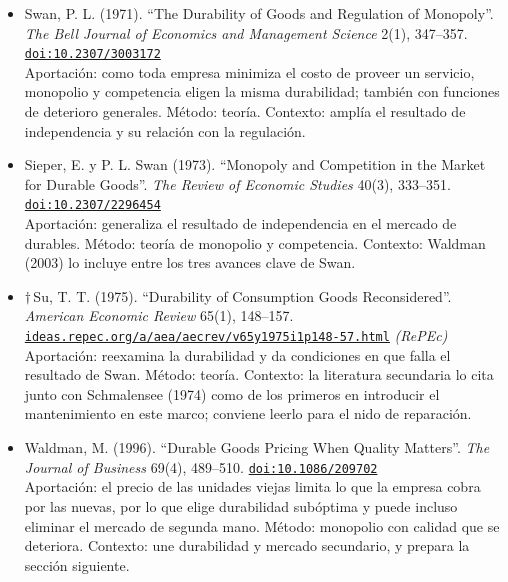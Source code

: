 \documentclass[11pt]{article}
\begin{document}
\begin{itemize}
\item Swan, P. L. (1971). ``The Durability of Goods and Regulation of Monopoly''. \textit{The Bell Journal of Economics and Management Science} 2(1), 347--357. \href{https://doi.org/10.2307/3003172}{\texttt{doi:10.2307/3003172}}\\
Aportación: como toda empresa minimiza el costo de proveer un servicio, monopolio y competencia eligen la misma durabilidad; también con funciones de deterioro generales. Método: teoría. Contexto: amplía el resultado de independencia y su relación con la regulación.
\item Sieper, E. y P. L. Swan (1973). ``Monopoly and Competition in the Market for Durable Goods''. \textit{The Review of Economic Studies} 40(3), 333--351. \href{https://doi.org/10.2307/2296454}{\texttt{doi:10.2307/2296454}}\\
Aportación: generaliza el resultado de independencia en el mercado de durables. Método: teoría de monopolio y competencia. Contexto: Waldman (2003) lo incluye entre los tres avances clave de Swan.
\item $\dagger$\,Su, T. T. (1975). ``Durability of Consumption Goods Reconsidered''. \textit{American Economic Review} 65(1), 148--157. \href{https://ideas.repec.org/a/aea/aecrev/v65y1975i1p148-57.html}{\texttt{ideas.repec.org/a/aea/aecrev/v65y1975i1p148-57.html}} \textit{(RePEc)}\\
Aportación: reexamina la durabilidad y da condiciones en que falla el resultado de Swan. Método: teoría. Contexto: la literatura secundaria lo cita junto con Schmalensee (1974) como de los primeros en introducir el mantenimiento en este marco; conviene leerlo para el nido de reparación.
\item Waldman, M. (1996). ``Durable Goods Pricing When Quality Matters''. \textit{The Journal of Business} 69(4), 489--510. \href{https://doi.org/10.1086/209702}{\texttt{doi:10.1086/209702}}\\
Aportación: el precio de las unidades viejas limita lo que la empresa cobra por las nuevas, por lo que elige durabilidad subóptima y puede incluso eliminar el mercado de segunda mano. Método: monopolio con calidad que se deteriora. Contexto: une durabilidad y mercado secundario, y prepara la sección siguiente.
\end{itemize}
\end{document}
